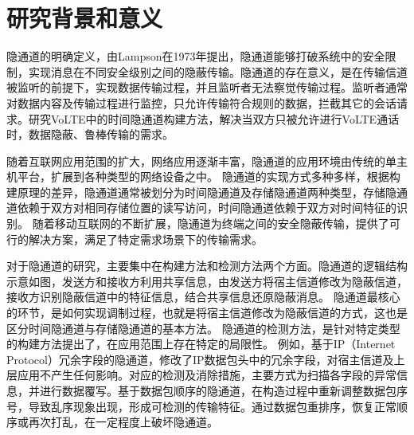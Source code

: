 \section{研究背景和意义}
\label{sec:intro:backgroud}



隐通道的明确定义，由Lampson在1973年提出，隐通道能够打破系统中的安全限制，实现消息在不同安全级别之间的隐蔽传输。隐通道的存在意义，是在传输信道被监听的前提下，实现数据传输过程，并且监听者无法察觉传输过程。监听者通常对数据内容及传输过程进行监控，只允许传输符合规则的数据，拦截其它的会话请求。研究VoLTE中的时间隐通道构建方法，解决当双方只被允许进行VoLTE通话时，数据隐蔽、鲁棒传输的需求。

随着互联网应用范围的扩大，网络应用逐渐丰富，隐通道的应用环境由传统的单主机平台，扩展到各种类型的网络设备之中。
隐通道的实现方式多种多样，根据构建原理的差异，隐通道通常被划分为时间隐通道及存储隐通道两种类型，存储隐通道依赖于双方对相同存储位置的读写访问，时间隐通道依赖于双方对时间特征的识别。
随着移动互联网的不断扩展，隐通道为终端之间的安全隐蔽传输，提供了可行的解决方案，满足了特定需求场景下的传输需求。


对于隐通道的研究，主要集中在构建方法和检测方法两个方面。隐通道的逻辑结构示意如图，发送方和接收方利用共享信息，由发送方将宿主信道修改为隐蔽信道，接收方识别隐蔽信道中的特征信息，结合共享信息还原隐蔽消息。
隐通道最核心的环节，是如何实现调制过程，也就是将宿主信道修改为隐蔽信道的方式，这也是区分时间隐通道与存储隐通道的基本方法。
隐通道的检测方法，是针对特定类型的构建方法提出了，在应用范围上存在特定的局限性。
例如，基于IP（Internet Protocol）冗余字段的隐通道，修改了IP数据包头中的冗余字段，对宿主信道及上层应用不产生任何影响。对应的检测及消除措施，主要方式为扫描各字段的异常信息，并进行数据覆写。基于数据包顺序的隐通道，在构造过程中重新调整数据包序号，导致乱序现象出现，形成可检测的传输特征。通过数据包重排序，恢复正常顺序或再次打乱，在一定程度上破坏隐通道。

